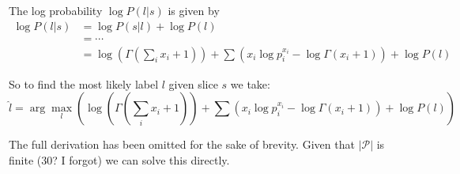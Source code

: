 \documentclass[12pt,a4paper,twoside,openright]{report}
\theoremstyle{definition}
\begin{document}
The log probability $\log P(l|s)$ is given by 
\begin{equation}
  \begin{aligned}
    \log P(l|s) &= \log P(s|l) + \log P(l) \\      
                &= \cdots \\
                &= \log \left(\Gamma\left(\sum\limits_{i} x_i + 1\right) \right) 
                +  \sum\limits \left( x_i \log p_i^{x_i} - \log \Gamma (x_i + 1) \right) 
                +  \log P(l)
  \end{aligned}
  \label{eq:loglabelgivenchordtones}
\end{equation}

So to find the most likely label $l$ given slice $s$ we take:
\begin{equation}
  \hat{l} = \arg\max_l \left(\log \left(\Gamma\left(\sum\limits_{i} x_i + 1\right) \right) 
                +  \sum\limits \left( x_i \log p_i^{x_i} - \log \Gamma (x_i + 1) \right) 
                +  \log P(l) \right)
  \label{eq:loglabsol}
\end{equation}


The full derivation has been omitted for the sake of brevity. Given that $|\mathcal{P}|$ is finite ($30$? I forgot) we can solve this directly. 

\end{document}
